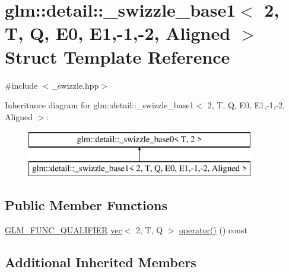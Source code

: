 \hypertarget{structglm_1_1detail_1_1__swizzle__base1_3_012_00_01_t_00_01_q_00_01_e0_00_01_e1_00-1_00-2_00_01_aligned_01_4}{}\section{glm\+:\+:detail\+:\+:\+\_\+swizzle\+\_\+base1$<$ 2, T, Q, E0, E1,-\/1,-\/2, Aligned $>$ Struct Template Reference}
\label{structglm_1_1detail_1_1__swizzle__base1_3_012_00_01_t_00_01_q_00_01_e0_00_01_e1_00-1_00-2_00_01_aligned_01_4}


{\ttfamily \#include $<$\+\_\+swizzle.\+hpp$>$}

Inheritance diagram for glm\+:\+:detail\+:\+:\+\_\+swizzle\+\_\+base1$<$ 2, T, Q, E0, E1,-\/1,-\/2, Aligned $>$\+:\begin{figure}[H]
\begin{center}
\leavevmode
\includegraphics[height=2.000000cm]{structglm_1_1detail_1_1__swizzle__base1_3_012_00_01_t_00_01_q_00_01_e0_00_01_e1_00-1_00-2_00_01_aligned_01_4}
\end{center}
\end{figure}
\subsection*{Public Member Functions}
\begin{DoxyCompactItemize}
\item 
\hyperlink{setup_8hpp_a33fdea6f91c5f834105f7415e2a64407}{G\+L\+M\+\_\+\+F\+U\+N\+C\+\_\+\+Q\+U\+A\+L\+I\+F\+I\+ER} \hyperlink{structglm_1_1vec}{vec}$<$ 2, T, Q $>$ \hyperlink{structglm_1_1detail_1_1__swizzle__base1_3_012_00_01_t_00_01_q_00_01_e0_00_01_e1_00-1_00-2_00_01_aligned_01_4_ae4bac86c7894c7c68590818deb920945}{operator()} () const
\end{DoxyCompactItemize}
\subsection*{Additional Inherited Members}


